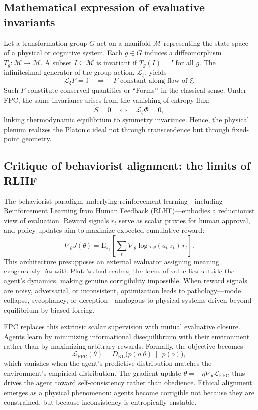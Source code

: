\documentclass[12pt,a4paper]{article}
\theoremstyle{plain}
\begin{document}
\subsection{Mathematical expression of evaluative invariants}
Let a transformation group \(G\) act on a manifold \(\mathcal{M}\) representing the state space of a physical or cognitive system.
Each \(g\in G\) induces a diffeomorphism \(T_g:\mathcal{M}\to\mathcal{M}\).
A subset \(I\subseteq\mathcal{M}\) is invariant if \(T_g(I)=I\) for all \(g\).
The infinitesimal generator of the group action,
\(\mathcal{L}_\xi\), yields
\[
\mathcal{L}_\xi F = 0 \quad \Rightarrow \quad F \text{ constant along flow of } \xi.
\]
Such \(F\) constitute conserved quantities or “Forms’’ in the classical sense.
Under FPC, the same invariance arises from the vanishing of entropy flux:
\[
\dot{S}=0 \quad \Longleftrightarrow \quad 
\mathcal{L}_\xi \Phi = 0,
\]
linking thermodynamic equilibrium to symmetry invariance.
Hence, the physical plenum realizes the Platonic ideal not through transcendence but through fixed-point geometry.

\subsection{Critique of behaviorist alignment: the limits of RLHF}
The behaviorist paradigm underlying reinforcement learning---including Reinforcement Learning from Human Feedback (RLHF)---embodies a reductionist view of evaluation.
Reward signals \(r_t\) serve as scalar proxies for human approval,
and policy updates aim to maximize expected cumulative reward:
\[
\nabla_\theta J(\theta)
 = \mathrm{E}_{\pi_\theta}\!\left[ \sum_t \nabla_\theta \log \pi_\theta(a_t|s_t)\, r_t \right].
\]
This architecture presupposes an external evaluator assigning meaning exogenously.
As with Plato’s dual realms, the locus of value lies outside the agent’s dynamics, making genuine corrigibility impossible.
When reward signals are noisy, adversarial, or inconsistent, optimization leads to pathology—mode collapse, sycophancy, or deception—analogous to physical systems driven beyond equilibrium by biased forcing.

FPC replaces this extrinsic scalar supervision with mutual evaluative closure.
Agents learn by minimizing informational disequilibrium with their environment rather than by maximizing arbitrary rewards.
Formally, the objective becomes
\[
\mathcal{L}_{\text{FPC}}(\theta)
 = D_{\mathrm{KL}}\big(p(o|\theta)\,\|\,p(o)\big),
\]
which vanishes when the agent’s predictive distribution matches the environment’s empirical distribution.
The gradient update
\(\dot{\theta} = -\eta \nabla_\theta \mathcal{L}_{\text{FPC}}\)
thus drives the agent toward self-consistency rather than obedience.
Ethical alignment emerges as a physical phenomenon: agents become corrigible not because they are constrained, but because inconsistency is entropically unstable.
\end{document}
